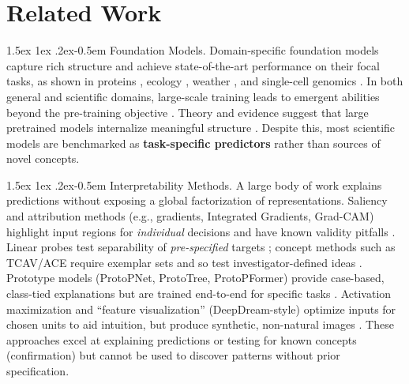 \documentclass[runningheads]{llncs}
\makeatletter
\renewcommand{\paragraph}{%
  \@startsection{paragraph}{4}%
  {\z@}{1.5ex \@plus 1ex \@minus .2ex}{-0.5em}%
  {\normalfont\normalsize\bfseries}%
}
\makeatother
\begin{document}
\section{Related Work}


\paragraph{Foundation Models.}
Domain-specific foundation models capture rich structure and achieve state-of-the-art performance on their focal tasks, as shown in proteins \citep{abramson2024alphafold3,hayes2025esm3}, ecology \citep{stevens2024bioclip}, weather \citep{lam2023graphcast,price2025gencast}, and single-cell genomics \citep{cui2024scgpt}.
In both general and scientific domains, large-scale training leads to emergent abilities beyond the pre-training objective \citep{wei2022emergent,gu2025bioclip2}.
Theory and evidence suggest that large pretrained models internalize meaningful structure \citep{ha2018world,caron2021dinov1,lecun2022jepa,huh2024platonic}.
Despite this, most scientific models are benchmarked as \textbf{task-specific predictors} rather than sources of novel concepts.

\paragraph{Interpretability Methods.}
A large body of work explains predictions without exposing a global factorization of representations.
Saliency and attribution methods (e.g., gradients, Integrated Gradients, Grad-CAM) highlight input regions for \emph{individual} decisions and have known validity pitfalls \citep{simonyan2013deep,sundararajan2017axiomatic,selvaraju2017gradcam,adebayo2018sanity}.
Linear probes test separability of \emph{pre-specified} targets \citep{alain2016understanding,hewitt2019probes}; concept methods such as TCAV/ACE require exemplar sets and so test investigator-defined ideas \citep{kim2018tcav,ghorbani2019ace}.
Prototype models (ProtoPNet, ProtoTree, ProtoPFormer) provide case-based, class-tied explanations but are trained end-to-end for specific tasks \citep{chen2019protopnet,nauta2021prototree,xue2022protopformer}.
Activation maximization and “feature visualization” (DeepDream-style) optimize inputs for chosen units to aid intuition, but produce synthetic, non-natural images \citep{mahendran2016visualizing,nguyen2016dgn,olah2017feature}.
These approaches excel at explaining predictions or testing for known concepts (confirmation) but cannot be used to discover patterns without prior specification.
\end{document}
